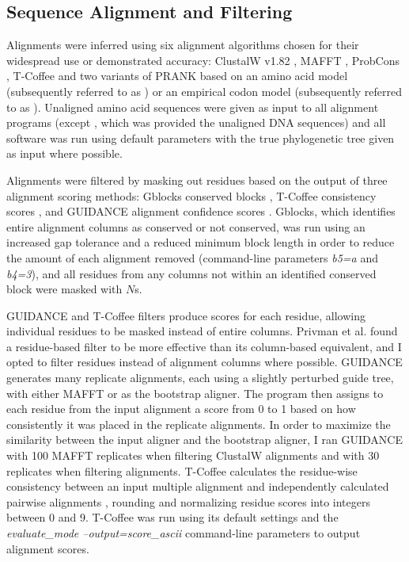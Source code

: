 \subsection{Sequence Alignment and Filtering}

Alignments were inferred using six alignment algorithms chosen for
their widespread use or demonstrated accuracy: ClustalW v1.82
\citep{Thompson1994ClustalW}, MAFFT \citep{Katoh2005}, ProbCons
\citep{Do2005a}, T-Coffee \citep{Notredame2000} and two variants of
PRANK \citep{Loytynoja2008PhylogenyAware} based on an amino acid model
(subsequently referred to as \pranka{}) or an empirical codon model
(subsequently referred to as \prankc{}). Unaligned amino acid
sequences were given as input to all alignment programs (except
\prankc{}, which was provided the unaligned DNA sequences) and all
software was run using default parameters with the true phylogenetic
tree given as input where possible.

Alignments were filtered by masking out residues based on the output
of three alignment scoring methods: Gblocks conserved blocks
\citep{Castresana2000Selection}, T-Coffee consistency scores
\citep{Notredame2000,Notredame2003Using}, and GUIDANCE
alignment confidence scores \citep{Penn2010Alignment}. Gblocks, which
identifies entire alignment columns as conserved or not conserved, was
run using an increased gap tolerance and a reduced minimum block
length in order to reduce the amount of each alignment removed
(command-line parameters {\em b5=a} and {\em b4=3}), and all residues
from any columns not within an identified conserved block were masked
with $N$s.

GUIDANCE and T-Coffee filters produce scores for each residue,
allowing individual residues to be masked instead of entire
columns. Privman et al. \citeyearpar{Privman2011Improving} found a
residue-based filter to be more effective than its column-based
equivalent, and I opted to filter residues instead of alignment
columns where possible. GUIDANCE generates many replicate alignments,
each using a slightly perturbed guide tree, with either MAFFT or
\pranka as the bootstrap aligner. The program then assigns to each
residue from the input alignment a score from 0 to 1 based on how
consistently it was placed in the replicate alignments. In order to
maximize the similarity between the input aligner and the bootstrap
aligner, I ran GUIDANCE with 100 MAFFT replicates when filtering
ClustalW alignments and with 30 \pranka replicates when filtering
\prankc alignments. T-Coffee calculates the residue-wise consistency
between an input multiple alignment and independently calculated
pairwise alignments \citep{Notredame2003Using}, rounding and
normalizing residue scores into integers between 0 and 9. T-Coffee was
run using its default settings and the {\em evaluate\_mode
  --output=score\_ascii} command-line parameters to output alignment
scores.


